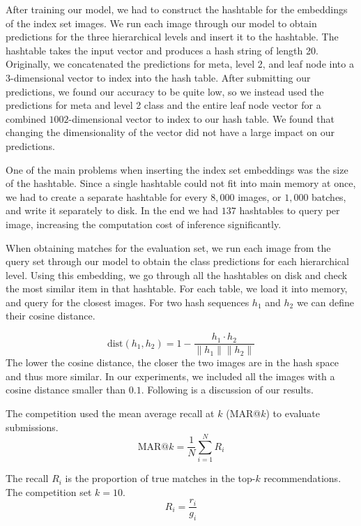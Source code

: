 \documentclass[conference]{IEEEtran}
\begin{document}
After training our model, we had to construct the hashtable for the 
embeddings of the index set images.
We run each image through our model to obtain predictions for the 
three hierarchical levels and insert it to the hashtable.
The hashtable takes the input vector and produces a hash string  of length 20.
Originally, we concatenated the predictions for meta, level 2, and leaf node
into a 3-dimensional vector to index into the hash table.
After submitting our predictions, we found our accuracy to be quite low, so we
instead used the predictions for meta and level 2 class and the entire leaf 
node vector for a combined $1002$-dimensional vector to index to our hash table.
We found that changing the dimensionality of the vector did not have a large
impact on our predictions.


One of the main problems when inserting the index set embeddings was the size of the hashtable.
Since a single hashtable could not fit into main memory at once, 
we had to create a separate hashtable for every $8,000$ images, or $1,000$ batches, and write 
it separately to disk.
In the end we had $137$ hashtables to query per image, increasing
the computation cost of inference significantly.


When obtaining matches for the evaluation set, we run each image from the query set through 
our model to obtain the class predictions for each hierarchical level.
Using this embedding, we go through all the hashtables on disk and check
the most similar item in that hashtable.
For each table, we load it into memory, and query for the closest images.
For two hash sequences $h_1$ and $h_2$ we can define their cosine distance.

\begin{equation}
	\textrm{dist}(h_1, h_2) = 1 - \frac{h_1 \cdot h_2}{\|h_1\|\|h_2\|}
	\label{eq:cosinesim}
\end{equation}
The lower the cosine distance, the closer the two images are in the hash space 
and thus more similar.
In our experiments, we included all the images with a cosine distance smaller than $0.1$.
Following is a discussion of our results.

The competition used the mean average recall at $k$ (MAR@$k$) to evaluate submissions.
\begin{equation}
	\textrm{MAR@}k = \frac{1}{N}\sum_{i=1}^{N}R_i
	\label{eq:mar@k}
\end{equation}

The recall $R_i$ is the proportion of true matches in the top-$k$ recommendations.
The competition set $k = 10$.
\begin{equation}
	R_i = \frac{r_i}{g_i}
	\label{eq:recall}
\end{equation}
\end{document}
